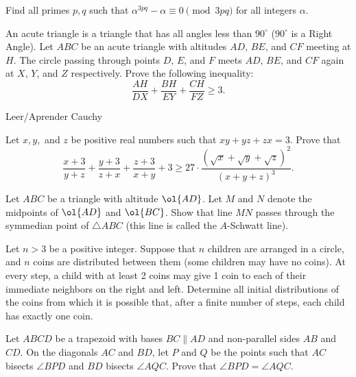 \documentclass[11pt]{scrartcl}
\begin{document}
\begin{problem}
Find all primes $ p,q $ such that $ \alpha^{3pq} -\alpha \equiv 0 \pmod {3pq} $ for all integers $ \alpha $.
\end{problem}
\begin{problem}[Canada 2023/3]
    An acute triangle is a triangle that has all angles less than $90^{\circ}$ ($90^{\circ}$ is a Right Angle). Let $ABC$ be an acute triangle with altitudes $AD$, $BE$, and $CF$ meeting at $H$. The circle passing through points $D$, $E$, and $F$ meets $AD$, $BE$, and $CF$ again at $X$, $Y$, and $Z$ respectively. Prove the following inequality:$$\frac{AH}{DX}+\frac{BH}{EY}+\frac{CH}{FZ} \geq 3.$$
\end{problem}
\begin{problem}
Leer/Aprender Cauchy
\end{problem}
\begin{problem}
Let $x, y,$ and $z$ be positive real numbers such that $xy + yz + zx = 3$. Prove that
$$\frac{x + 3}{y + z} + \frac{y + 3}{z + x} + \frac{z + 3}{x + y} + 3 \ge 27 \cdot \frac{(\sqrt{x} + \sqrt{y} + \sqrt{z})^2}{(x + y + z)^3}.$$
\end{problem}
\begin{problem}
  Let $ABC$ be a triangle with altitude $\ol{AD}$.
  Let $M$ and $N$ denote the midpoints of $\ol{AD}$ and $\ol{BC}$.
  Show that line $MN$ passes through
  the symmedian point of $\triangle ABC$
  (this line is called the $A$-Schwatt line).
\end{problem}
\begin{problem}[IMO SL 2022/C4]
Let $n > 3$ be a positive integer. Suppose that $n$ children are arranged in a circle, and $n$ coins are distributed between them (some children may have no coins). At every step, a child with at least 2 coins may give 1 coin to each of their immediate neighbors on the right and left. Determine all initial distributions of the coins from which it is possible that, after a finite number of steps, each child has exactly one coin.  
\end{problem}
\begin{problem}
Let $ABCD$ be a trapezoid with bases $BC \parallel AD$ and non-parallel sides $AB$ and $CD$. On the diagonals $AC$ and $BD$, let $P$ and $Q$ be the points such that $AC$ bisects $\angle BPD$ and $BD$ bisects $\angle AQC$. Prove that $\angle BPD = \angle AQC$.
\end{problem}
\end{document}
